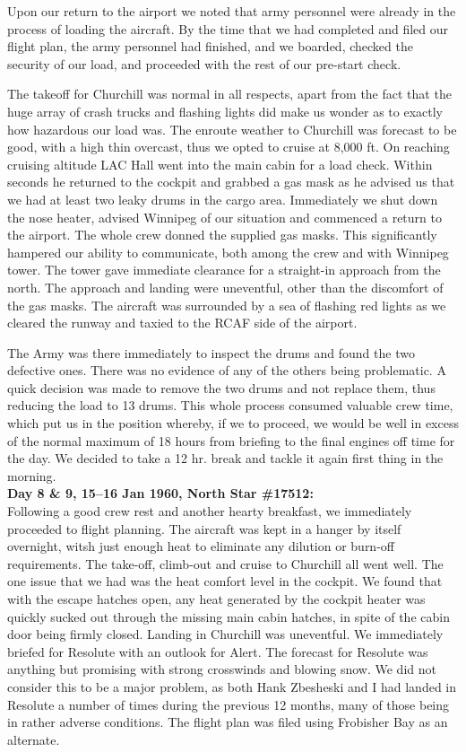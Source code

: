 Upon our return to the airport we noted that army personnel were
already in the process of loading the aircraft. By the time that we had
completed and filed our flight plan, the army personnel had finished,
and we boarded, checked the security of our load, and proceeded with
the rest of our pre-start check.

The takeoff for Churchill was normal in all respects, apart from the
fact that the huge array of crash trucks and flashing lights did make
us wonder as to exactly how hazardous our load was. The enroute weather
to Churchill was forecast to be good, with a high thin overcast, thus
we opted to cruise at 8,000 ft. On reaching cruising altitude LAC Hall
went into the main cabin for a load check.  Within seconds he returned
to the cockpit and grabbed a gas mask as he advised us that we had at
least two leaky drums in the cargo area. Immediately we shut down the
nose heater, advised Winnipeg of our situation and commenced a return
to the airport. The whole crew donned the supplied gas masks. This
significantly hampered our ability to communicate, both among the crew
and with Winnipeg tower. The tower gave immediate clearance for a
straight-in approach from the north. The approach and landing were
uneventful, other than the discomfort of the gas masks. The aircraft
was surrounded by a sea of flashing red lights as we cleared the runway
and taxied to the RCAF side of the airport.

The Army was there immediately to inspect the drums and found the two
defective ones. There was no evidence of any of the others being
problematic. A quick decision was made to remove the two drums and not
replace them, thus reducing the load to 13 drums. This whole process
consumed valuable crew time, which put us in the position whereby, if
we to proceed, we would be well in excess of the normal maximum of 18
hours from briefing to the final engines off time for the day. We
decided to take a 12 hr. break and tackle it again first thing in the
morning.\\

\noindent\textbf{Day 8 \& 9, 15--16 Jan 1960, North Star \#17512:}\\

Following a good crew rest and another hearty breakfast, we immediately
proceeded to flight planning. The aircraft was kept in a hanger by
itself overnight, witsh just enough heat to eliminate any dilution or
burn-off requirements. The take-off, climb-out and cruise to Churchill
all went well. The one issue that we had was the heat comfort level in
the cockpit. We found that with the escape hatches open, any heat
generated by the cockpit heater was quickly sucked out through the
missing main cabin hatches, in spite of the cabin door being firmly
closed. Landing in Churchill was uneventful. We immediately briefed for
Resolute with an outlook for Alert. The forecast for Resolute was
anything but promising with strong crosswinds and blowing snow. We did
not consider this to be a major problem, as both Hank Zbesheski and I
had landed in Resolute a number of times during the previous 12 months,
many of those being in rather adverse conditions. The flight plan was
filed using Frobisher Bay as an alternate.

